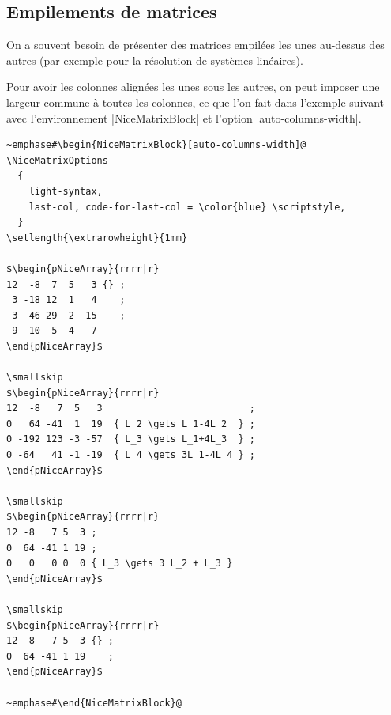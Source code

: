 \documentclass[dvipsnames]{article}%
\begin{document}
\subsection{Empilements de matrices}

On a souvent besoin de présenter des matrices empilées les unes au-dessus des
autres (par exemple pour la résolution  de systèmes linéaires).


\medskip
Pour avoir les colonnes alignées les unes sous les autres, on peut imposer une
largeur commune à toutes les colonnes, ce que l'on fait dans l'exemple suivant
avec l'environnement |{NiceMatrixBlock}| et l'option |auto-columns-width|.

\begin{Verbatim}[formatcom=\small\color{gray}]
~emphase#\begin{NiceMatrixBlock}[auto-columns-width]@
\NiceMatrixOptions
  {
    light-syntax,
    last-col, code-for-last-col = \color{blue} \scriptstyle,
  }
\setlength{\extrarowheight}{1mm}

$\begin{pNiceArray}{rrrr|r}
12  -8  7  5   3 {} ;
 3 -18 12  1   4    ;
-3 -46 29 -2 -15    ;
 9  10 -5  4   7
\end{pNiceArray}$

\smallskip
$\begin{pNiceArray}{rrrr|r}
12  -8   7  5   3                          ;
0   64 -41  1  19  { L_2 \gets L_1-4L_2  } ;
0 -192 123 -3 -57  { L_3 \gets L_1+4L_3  } ;
0 -64   41 -1 -19  { L_4 \gets 3L_1-4L_4 } ;
\end{pNiceArray}$

\smallskip
$\begin{pNiceArray}{rrrr|r}
12 -8   7 5  3 ;
0  64 -41 1 19 ;
0   0   0 0  0 { L_3 \gets 3 L_2 + L_3 }
\end{pNiceArray}$

\smallskip
$\begin{pNiceArray}{rrrr|r}
12 -8   7 5  3 {} ;
0  64 -41 1 19    ;
\end{pNiceArray}$

~emphase#\end{NiceMatrixBlock}@
\end{Verbatim}
\end{document}
